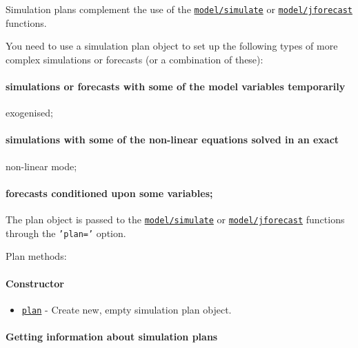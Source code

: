 

	Simulation plans complement the use of the
\href{model/simulate}{\texttt{model/simulate}} or
\href{model/jforecast}{\texttt{model/jforecast}} functions.

You need to use a simulation plan object to set up the following types
of more complex simulations or forecasts (or a combination of these):

\paragraph{simulations or forecasts with some of the model variables
temporarily}\label{simulations-or-forecasts-with-some-of-the-model-variables-temporarily}

exogenised;

\paragraph{simulations with some of the non-linear equations solved in
an
exact}\label{simulations-with-some-of-the-non-linear-equations-solved-in-an-exact}

non-linear mode;

\paragraph{forecasts conditioned upon some
variables;}\label{forecasts-conditioned-upon-some-variables}

The plan object is passed to the
\href{model/simulate}{\texttt{model/simulate}} or
\href{model/jforecast}{\texttt{model/jforecast}} functions through the
\texttt{'plan='} option.

Plan methods:

\paragraph{Constructor}\label{constructor}

\begin{itemize}
\itemsep1pt\parskip0pt
\item
  \href{plan/plan}{\texttt{plan}} - Create new, empty simulation plan
  object.
\end{itemize}

\paragraph{Getting information about simulation
plans}\label{getting-information-about-simulation-plans}

